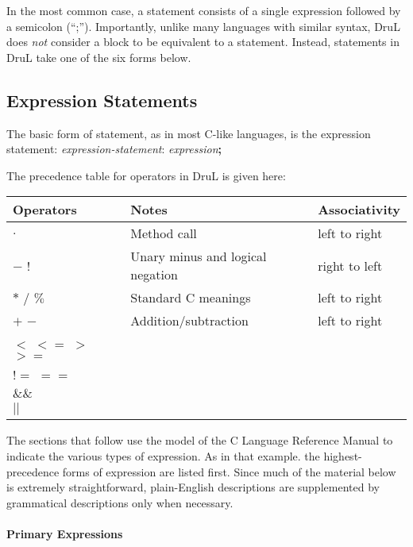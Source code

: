 In the most common case, a statement consists of a single expression followed by a semicolon (``;'').  Importantly, unlike many languages with similar syntax, DruL does \emph{not} consider a block to be equivalent to a statement.  Instead, statements in DruL take one of the six forms below.

\subsection{Expression Statements}

The basic form of statement, as in most C-like languages, is the expression statement: \emph{expression-statement}: \emph{expression}\textbf{;}

The precedence table for operators in DruL is given here:

\begin{tabular}{ l |l| l}
\hline\hline
Operators         & Notes                            & Associativity \\ \hline
$ . $             & Method call                      & left to right \\
$-$  $!$          & Unary minus and logical negation & right to left \\
$*$ $/$ $\%$      & Standard C meanings              & left to right \\
$+$ $-$           & Addition/subtraction             & left to right \\
$<$ $<=$ $>$ $>=$ &                                  &               \\
$!=$ $==$         &                                  &               \\
$\&\&$            &                                  &               \\
$||$              &                                  &
\end{tabular}

The sections that follow use the model of the C Language Reference Manual to indicate the various types of expression.  As in that example. the highest-precedence forms of expression are listed first.  Since much of the material below is extremely straightforward, plain-English descriptions are supplemented by grammatical descriptions only when necessary.

\paragraph{Primary Expressions}

